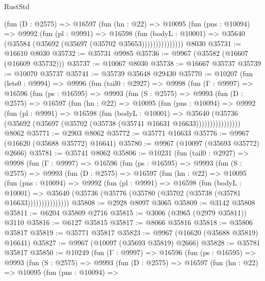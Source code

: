 \begin{lexlean}{RustStd}
\begin{coremodule}
                (fun (D : @2575) =>
                @16597
                  (fun (hn : @22) =>
                  @10095
                    (fun (pns : @10094) =>
                    @9992
                      (fun (pl : @9991) =>
                      @16598
                        (fun (bodyL : @10001) =>
                        @35640 (@35584 (@35692 (@35697 (@35702 @35653)))))))))))))))
    @8030
@35731 := @16610 @8030
@35732 := @35731 @9985
@35736 := @9967 (@35582 (@16607 (@16609 @35732)))
@35737 := @10067 @8030
@35738 := @16667 @35737
@35739 := @10070 @35737
@35741 := @35739 @35648 @29430
@35770 := @10207
    (fun (lets0 : @9994) =>
    @9996
      (fun (tail0 : @2927) =>
      @9998
        (fun (Γ : @9997) =>
        @16596
          (fun (ps : @16595) =>
          @9993
            (fun (S : @2575) =>
            @9993
              (fun (D : @2575) =>
              @16597
                (fun (hn : @22) =>
                @10095
                  (fun (pns : @10094) =>
                  @9992
                    (fun (pl : @9991) =>
                    @16598
                      (fun (bodyL : @10001) =>
                      @35640
                        (@35736
                          (@35692 (@35697 (@35702 (@35738 (@35741 @16631 @16633))))))))))))))))
    @8062
@35771 := @2903 @8062
@35772 := @35771 @16633
@35776 := @9967 (@16620 (@35688 @35772) @16641)
@35780 := @9967 (@10097 (@35693 @35772) @2666)
@35781 := @35741 @8062
@35806 := @10231
    (fun (tail0 : @2927) =>
    @9998
      (fun (Γ : @9997) =>
      @16596
        (fun (ps : @16595) =>
        @9993
          (fun (S : @2575) =>
          @9993
            (fun (D : @2575) =>
            @16597
              (fun (hn : @22) =>
              @10095
                (fun (pns : @10094) =>
                @9992
                  (fun (pl : @9991) =>
                  @16598
                    (fun (bodyL : @10001) =>
                    @35640 (@35736 (@35776 (@35780 (@35702 (@35738 (@35781 @16633)))))))))))))))
@35808 := @2928 @8097 @3065
@35809 := @3142 @35808
@35811 := @6204 @35809 @2716
@35815 := @3006 (@3965 (@2979 @35811)) @3110
@35816 := @6127 @35815
@35817 := @8066 @35816
@35818 := @35806 @35817
@35819 := @35771 @35817
@35823 := @9967 (@16620 (@35688 @35819) @16641)
@35827 := @9967 (@10097 (@35693 @35819) @2666)
@35828 := @35781 @35817
@35850 := @10249
    (fun (Γ : @9997) =>
    @16596
      (fun (ps : @16595) =>
      @9993
        (fun (S : @2575) =>
        @9993
          (fun (D : @2575) =>
          @16597
            (fun (hn : @22) =>
            @10095
              (fun (pns : @10094) =>

\end{coremodule}
\end{lexlean}
